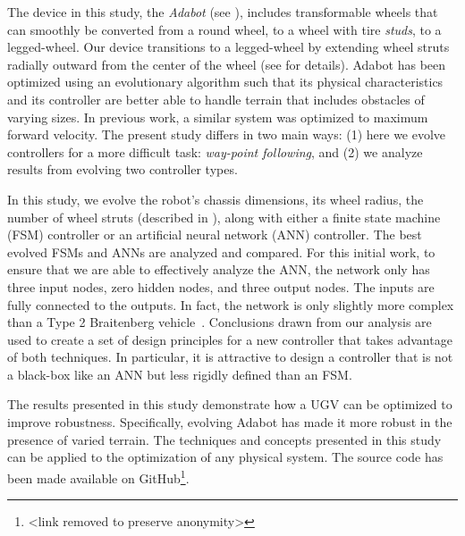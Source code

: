 The device in this study, the \emph{Adabot} (see ), includes transformable wheels that can smoothly be converted from a round wheel, to a wheel with tire \emph{studs}, to a legged-wheel.
%
Our device transitions to a legged-wheel by extending wheel struts radially outward from the center of the wheel (see  for details).
%
Adabot has been optimized using an evolutionary algorithm such that its physical characteristics and its controller are better able to handle terrain that includes obstacles of varying sizes.
%
In previous work, a similar system was optimized to maximum forward velocity.
%
The present study differs in two main ways: (1) here we evolve controllers for a more difficult task: \emph{way-point following}, and (2) we analyze results from evolving two controller types.



In this study, we evolve the robot's chassis dimensions, its wheel radius, the number of wheel struts (described in ), along with either a finite state machine (FSM) controller or an artificial neural network (ANN) controller.
%
The best evolved FSMs and ANNs are analyzed and compared.
%
For this initial work, to ensure that we are able to effectively analyze the ANN, the network only has three input nodes, zero hidden nodes, and three output nodes. The inputs are fully connected to the outputs.
%
In fact, the network is only slightly more complex than a Type 2 Braitenberg vehicle~\autocite{Braitenberg.Vehicles.Book.1986}.
%
Conclusions drawn from our analysis are used to create a set of design principles for a new controller that takes advantage of both techniques.
%
In particular, it is attractive to design a controller that is not a black-box like an ANN but less rigidly defined than an FSM.


The results presented in this study demonstrate how a UGV can be optimized to improve robustness.
%
Specifically, evolving Adabot has made it more robust in the presence of varied terrain.
%
The techniques and concepts presented in this study can be applied to the optimization of any physical system.
%
The source code has been made available on GitHub\footnote{<link removed to preserve anonymity>}.

